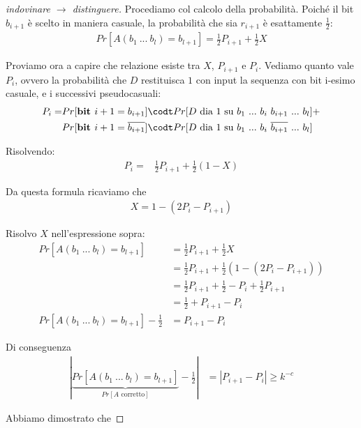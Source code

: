 \begin{proof}[indovinare $\rightarrow$ distinguere]
    Procediamo col calcolo della probabilità. Poiché il bit $b_{i+1}$ è scelto in maniera casuale, la probabilità che sia $r_{i+1}$ è esattamente $\frac{1}{2}$:
    \begin{align*}
        Pr[A(b_1 \ ... \ b_{l}) = b_{l+1}] = \frac{1}{2} P_{i+1} + \frac{1}{2} X
    \end{align*}

    \noindent Proviamo ora a capire che relazione esiste tra $X$, $P_{i+1}$ e $P_i$. Vediamo quanto vale $P_i$, ovvero la probabilità che $D$ restituisca $1$ con input la sequenza con bit i-esimo casuale, e i successivi pseudocasuali:
    \begin{align*}
        P_{i} = &Pr[\textbf{bit $i+1$} = b_{i+1}] \codt Pr[D\text{ dia $1$ su } b_1 \ ... \ b_i \ b_{i+1} \ ... \ b_l] + \\
        &Pr[\textbf{bit $i+1$} = \overline{b_{i+1}}] \codt Pr[D\text{ dia $1$ su } b_1 \ ... \ b_i \ \overline{ b_{i+1}} \ ... \ b_l]
    \end{align*} 

    \noindent Risolvendo:
    \begin{align*}
        P_{i} = &\frac{1}{2}P_{i+1} + \frac{1}{2} (1-X)
    \end{align*}

    \noindent Da questa formula ricaviamo che
    \begin{align*}
        X = 1 - (2P_i - P_{i+1})
    \end{align*}

    \noindent Risolvo $X$ nell'espressione sopra:
    \begin{align*}
        Pr[A(b_1 \ ... \ b_{l}) = b_{l+1}] &= \frac{1}{2} P_{i+1} + \frac{1}{2} X\\
        &= \frac{1}{2} P_{i+1} + \frac{1}{2} (1 - (2P_i - P_{i+1}))\\
        &= \frac{1}{2} P_{i+1} + \frac{1}{2} - P_i + \frac{1}{2} P_{i+1}\\
        &= \frac{1}{2} + P_{i+1} - P_i\\
        Pr[A(b_1 \ ... \ b_{l}) = b_{l+1}] - \frac{1}{2} &= P_{i+1} - P_i
    \end{align*}

    \noindent Di conseguenza
    \begin{align*}
        \left|\underbrace{Pr[A(b_1 \ ... \ b_{l}) = b_{l+1}]}_{Pr[A \text{ corretto}]} - \frac{1}{2} \right| &= \left|P_{i+1} - P_i \right| \ge k^{-c}
    \end{align*}

    \noindent Abbiamo dimostrato che 
\end{proof}


